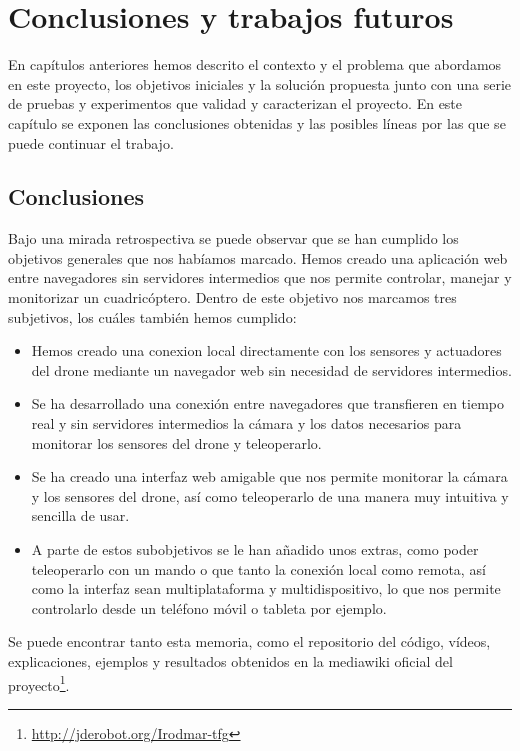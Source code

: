 \chapter{Conclusiones y trabajos futuros}

En capítulos anteriores hemos descrito el contexto y el problema que abordamos en este proyecto, los objetivos iniciales y la solución propuesta junto con una serie de pruebas y experimentos que validad y caracterizan el proyecto. En este capítulo se exponen las conclusiones obtenidas y las posibles líneas por las que se puede continuar el trabajo.\\

\section{Conclusiones}

Bajo una mirada retrospectiva se puede observar que se han cumplido los objetivos generales que nos habíamos marcado. Hemos creado una aplicación web entre navegadores sin servidores intermedios que nos permite controlar, manejar y monitorizar un cuadricóptero. Dentro de este objetivo nos marcamos tres subjetivos, los cuáles también hemos cumplido:\\

\begin{itemize}
\item Hemos creado una conexion local directamente con los sensores y actuadores del drone mediante un navegador web sin necesidad de servidores intermedios.
\item Se ha desarrollado una conexión entre navegadores que transfieren en tiempo real y sin servidores intermedios la cámara y los datos necesarios para monitorar los sensores del drone y teleoperarlo.
\item Se ha creado una interfaz web amigable que nos permite monitorar la cámara y los sensores del drone, así como teleoperarlo de una manera muy intuitiva y sencilla de usar.
\item A parte de estos subobjetivos se le han añadido unos extras, como poder teleoperarlo con un mando o que tanto la conexión local como remota, así como la interfaz sean multiplataforma y multidispositivo, lo que nos permite controlarlo desde un teléfono móvil o tableta por ejemplo.
\end{itemize} 

Se puede encontrar tanto esta memoria, como el repositorio del código, vídeos, explicaciones, ejemplos y resultados obtenidos en la mediawiki oficial del proyecto\footnote{\url{http://jderobot.org/Irodmar-tfg}}\cite{Mediawiki}.

